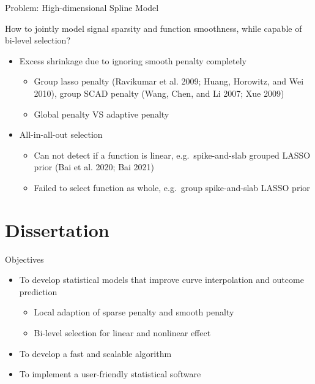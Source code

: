 \documentclass[
  ignorenonframetext,
  aspectratio=169]{beamer}
\providecommand{\tightlist}{%
  \setlength{\itemsep}{0pt}\setlength{\parskip}{0pt}}
\begin{document}
\begin{frame}{Problem: High-dimensional Spline Model}
\protect\hypertarget{problem-high-dimensional-spline-model}{}
\begin{tcolorbox}[colback=green!5,colframe=green!40!black,title=Question]
How to jointly model signal sparsity and function smoothness, while capable of bi-level selection?
\end{tcolorbox}

\begin{itemize}
\tightlist
\item
  Excess shrinkage due to ignoring smooth penalty completely

  \begin{itemize}
  \tightlist
  \item
    Group lasso penalty (Ravikumar et al. 2009; Huang, Horowitz, and Wei
    2010), group SCAD penalty (Wang, Chen, and Li 2007; Xue 2009)
  \item
    Global penalty VS adaptive penalty
  \end{itemize}
\item
  All-in-all-out selection

  \begin{itemize}
  \tightlist
  \item
    Can not detect if a function is linear, e.g.~spike-and-slab grouped
    LASSO prior (Bai et al. 2020; Bai 2021)
  \item
    Failed to select function as whole, e.g.~group spike-and-slab LASSO
    prior
  \end{itemize}
\end{itemize}
\end{frame}

\hypertarget{dissertation}{%
\section{Dissertation}\label{dissertation}}

\begin{frame}{Objectives}
\protect\hypertarget{objectives}{}
\begin{itemize}
\tightlist
\item
  To develop statistical models that improve curve interpolation and
  outcome prediction

  \begin{itemize}
  \tightlist
  \item
    Local adaption of sparse penalty and smooth penalty
  \item
    Bi-level selection for linear and nonlinear effect
  \end{itemize}
\item
  To develop a fast and scalable algorithm
\item
  To implement a user-friendly statistical software
\end{itemize}
\end{frame}
\end{document}
